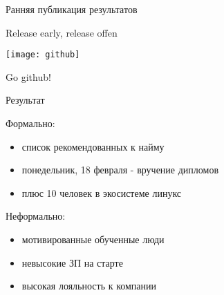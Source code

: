 \begin{frame}{Ранняя публикация результатов}

  \Large
  \begin{center}
    \alert{Release early, release offen} 

    \texttt{[image: github]}

    \alert{Go github!}
  \end{center}
  
\end{frame}

\begin{frame}{Результат}
  \begin{center}
    \large 
    Формально:
    \begin{itemize}
      \item список рекомендованных к найму 
      \item понедельник, 18 февраля - вручение дипломов  
      \item плюс 10 человек в экосистеме линукс
    \end{itemize} \pause

    Неформально:
    \begin{itemize}
      \item мотивированные обученные люди 
      \item невысокие ЗП на старте
      \item высокая лояльность к компании
    \end{itemize}
  \end{center}
\end{frame}
